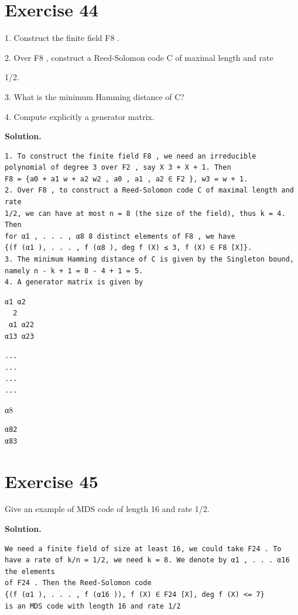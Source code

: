 \documentclass[11pt]{article}
\begin{document}
\section*{Exercise 44}
\begin{exercisebox}
1. Construct the finite field F8 .

2. Over F8 , construct a Reed-Solomon code C of maximal length and rate

1/2.

3. What is the minimum Hamming distance of C?

4. Compute explicitly a generator matrix.

\end{exercisebox}
\begin{solutionbox}
\textbf{Solution.}

\begin{Verbatim}[fontsize=\small]
1. To construct the finite field F8 , we need an irreducible polynomial of degree 3 over F2 , say X 3 + X + 1. Then
F8 = {a0 + a1 w + a2 w2 , a0 , a1 , a2 ∈ F2 }, w3 = w + 1.
2. Over F8 , to construct a Reed-Solomon code C of maximal length and rate
1/2, we can have at most n = 8 (the size of the field), thus k = 4. Then
for α1 , . . . , α8 8 distinct elements of F8 , we have
{(f (α1 ), . . . , f (α8 ), deg f (X) ≤ 3, f (X) ∈ F8 [X]}.
3. The minimum Hamming distance of C is given by the Singleton bound,
namely n - k + 1 = 8 - 4 + 1 = 5.
4. A generator matrix is given by
\end{Verbatim}
\begin{Verbatim}[fontsize=\small]
α1 α2
  2
 α1 α22
α13 α23
\end{Verbatim}
\begin{Verbatim}[fontsize=\small]
...
...
...
...
\end{Verbatim}
α8

\begin{Verbatim}[fontsize=\small]
α82
α83
\end{Verbatim}
\end{solutionbox}
\section*{Exercise 45}
\begin{exercisebox}
Give an example of MDS code of length 16 and rate 1/2.

\end{exercisebox}
\begin{solutionbox}
\textbf{Solution.}

\begin{Verbatim}[fontsize=\small]
We need a finite field of size at least 16, we could take F24 . To
have a rate of k/n = 1/2, we need k = 8. We denote by α1 , . . . α16 the elements
of F24 . Then the Reed-Solomon code
{(f (α1 ), . . . , f (α16 )), f (X) ∈ F24 [X], deg f (X) <= 7}
is an MDS code with length 16 and rate 1/2
\end{Verbatim}
\end{solutionbox}
\end{document}
